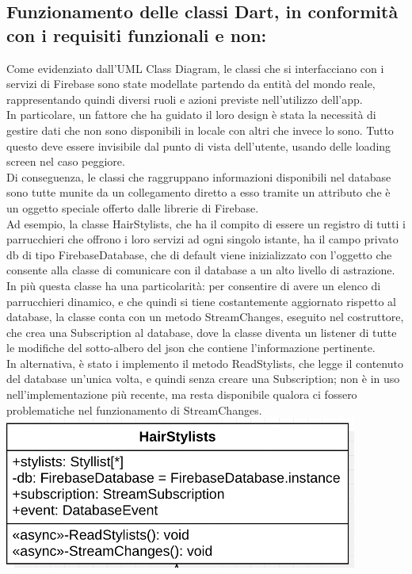 \documentclass{article}
\begin{document}
\subsection{Funzionamento delle classi Dart, in conformità con i requisiti funzionali e non:}
Come evidenziato dall’UML Class Diagram, le classi che si interfacciano con i servizi di Firebase sono state modellate partendo da entità del mondo reale, rappresentando quindi diversi ruoli e azioni previste nell’utilizzo dell’app. 
\\In particolare, un fattore che ha guidato il loro design è stata la necessità di gestire dati che non sono disponibili in locale con altri che invece lo sono. Tutto questo deve essere invisibile dal punto di vista dell’utente, usando delle loading screen nel caso peggiore. 
\\Di conseguenza, le classi che raggruppano informazioni disponibili nel database sono tutte munite da un collegamento diretto a esso tramite un attributo che è un oggetto speciale offerto dalle librerie di Firebase.
\\Ad esempio, la classe HairStylists, che ha il compito di essere un registro di tutti i parrucchieri che offrono i loro servizi ad ogni singolo istante, ha il campo privato db di tipo FirebaseDatabase, che di default viene inizializzato con l’oggetto che consente alla classe di comunicare con il database a un alto livello di astrazione. In più questa classe ha una particolarità: per consentire di avere un elenco di parrucchieri dinamico, e che quindi si tiene costantemente aggiornato rispetto al database, la classe conta con un metodo StreamChanges, eseguito nel costruttore, che crea una Subscription al database, dove la classe diventa un listener di tutte le modifiche del sotto-albero del json che contiene l’informazione pertinente.
\\In alternativa, è stato i implemento il metodo ReadStylists, che legge il contenuto del database un’unica volta, e quindi senza creare una Subscription; non è in uso nell’implementazione più recente, ma resta disponibile qualora ci fossero problematiche nel funzionamento di StreamChanges. 
\\ \includegraphics{Immagini/CalsseHairStylists.png} 
\end{document}
